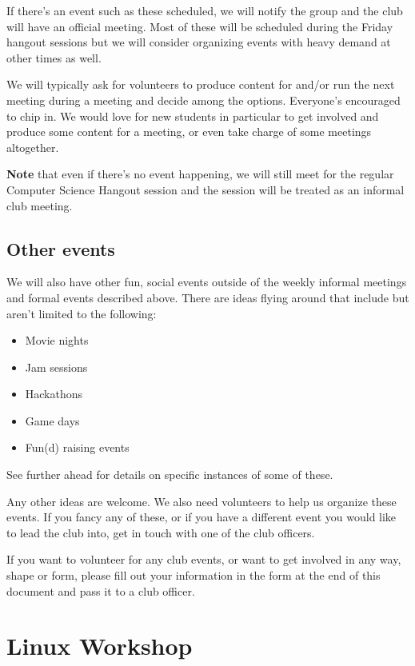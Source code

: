 If there's an event such as these scheduled, we will notify the group and the
club will have an official meeting. Most of these will be scheduled during the
Friday hangout sessions but we will consider organizing events with heavy
demand at other times as well.

We will typically ask for volunteers to produce content for and/or run the next
meeting during a meeting and decide among the options. Everyone's encouraged to
chip in. We would love for new students in particular to get involved and
produce some content for a meeting, or even take charge of some meetings
altogether.

\textbf{Note} that even if there's no event happening, we will still meet for the
regular Computer Science Hangout session and the session will be treated as an
informal club meeting.

\newpage

\subsection{Other events}
\label{sec-3-4}

We will also have other fun, social events outside of the weekly informal
meetings and formal events described above. There are ideas flying around that
include but aren't limited to the following:
\begin{itemize}
\item Movie nights
\item Jam sessions
\item Hackathons
\item Game days
\item Fun(d) raising events
\end{itemize}

See further ahead for details on specific instances of some of these.

Any other ideas are welcome. We also need volunteers to help us organize these
events. If you fancy any of these, or if you have a different event you would
like to lead the club into, get in touch with one of the club officers.

If you want to volunteer for any club events, or want to get involved in any
way, shape or form, please fill out your information in the form at the end of
this document and pass it to a club officer.


\newpage


\section{Linux Workshop}
\label{sec-4}

